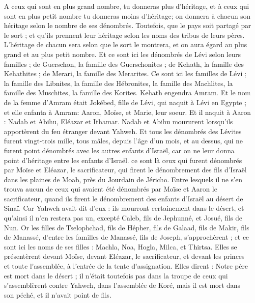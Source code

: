 \begin{multicols}{2}
A ceux qui sont en plus grand nombre, tu donneras plus d'héritage, et à ceux qui sont en plus petit nombre tu donneras moins d'héritage; on donnera à chacun son héritage selon le nombre de ses dénombrés.
Toutefois, que le pays soit partagé par le sort ; et qu’ils prennent leur héritage selon les noms des tribus de leurs pères.
L’héritage de chacun sera selon que le sort le montrera, et on aura égard au plus grand et au plus petit nombre.
Et ce sont ici les dénombrés de Lévi selon leurs familles ; de Guerschon, la famille des Guerschonites ; de Kehath, la famille des Kehathites ; de Merari, la famille des Merarites.
Ce sont ici les familles de Lévi ; la famille des Libnites, la famille des Hébronites, la famille des Machlites, la famille des Muschites, la famille des Korites. Kehath engendra Amram.
Et le nom de la femme d'Amram était Jokébed, fille de Lévi, qui naquit à Lévi en Egypte ; et elle enfanta à Amram: Aaron, Moïse, et Marie, leur soeur.
Et il naquit à Aaron : Nadab et Abihu, Eléazar et Ithamar.
Nadab et Abihu moururent lorsqu'ils apportèrent du feu étranger devant Yahweh.
Et tous les dénombrés des Lévites furent vingt-trois mille, tous mâles, depuis l’âge d’un mois, et au dessus, qui ne furent point dénombrés avec les autres enfants d’Israël, car on ne leur donna point d’héritage entre les enfants d’Israël.
ce sont là ceux qui furent dénombrés par Moïse et Eléazar, le sacrificateur, qui firent le dénombrement des fils d'Israël dans les plaines de Moab, près du Jourdain de Jéricho.
Entre lesquels il ne s’en trouva aucun de ceux qui avaient été dénombrés par Moïse et Aaron le sacrificateur, quand ils firent le dénombrement des enfants d’Israël au désert de Sinaï.
Car Yahweh avait dit d'eux : ils mourront certainement dans le désert, et qu'ainsi il n'en restera pas un, excepté Caleb, fils de Jephunné, et Josué, fils de Nun.
\VerseOne{}Or les filles de Tselophchad, fils de Hépher, fils de Galaad, fils de Makir, fils de Manassé, d'entre les familles de Manassé, fils de Joseph, s'approchèrent ;  et ce sont ici les noms de ses filles : Machla, Noa, Hogla, Milca, et Thirtsa.
Elles se présentèrent devant Moïse, devant Eléazar, le sacrificateur, et devant les princes et toute l'assemblée, à l'entrée de la tente d'assignation. Elles dirent :
Notre père est mort dans le désert ; il n'était toutefois pas dans la troupe de ceux qui s’assemblèrent contre Yahweh, dans l'assemblée de Koré, mais il est mort dans son péché, et il n'avait point de fils.

\end{multicols}

